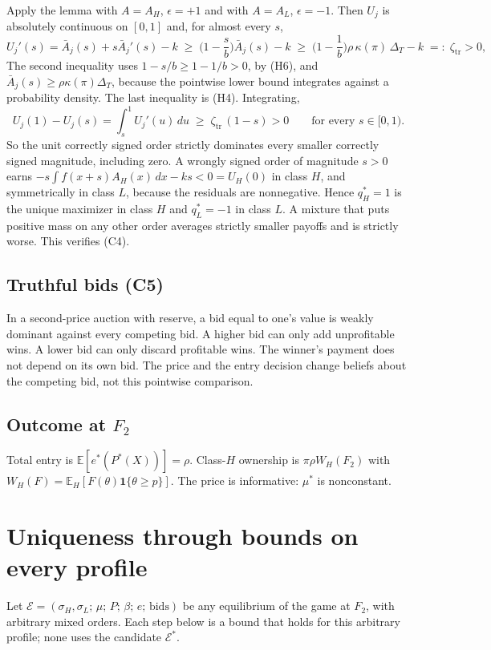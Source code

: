 \documentclass[12pt]{article}
\theoremstyle{remark}
\newcommand{\E}{\mathbb E}
\newcommand{\ind}{\mathbf 1}
\newcommand{\Dt}{\Delta_T}
\begin{document}
Apply the lemma with $A=A_H$, $\epsilon=+1$ and with $A=A_L$, $\epsilon=-1$. Then $U_j$ is
absolutely continuous on $[0,1]$ and, for almost every $s$,
\[
U_j'(s)=\bar A_j(s)+s\bar A_j'(s)-k\;\ge\;\Big(1-\frac sb\Big)\bar A_j(s)-k
\;\ge\;\Big(1-\frac1b\Big)\rho\,\kappa(\pi)\,\Dt-k\;=:\;\zeta_{\mathrm{tr}}>0,
\]
The second inequality uses $1-s/b\ge1-1/b>0$, by (H6), and
$\bar A_j(s)\ge\rho\kappa(\pi)\Dt$, because the pointwise lower bound integrates against a
probability density. The last inequality is (H4). Integrating,
\[
U_j(1)-U_j(s)=\int_s^1U_j'(u)\,du\;\ge\;\zeta_{\mathrm{tr}}\,(1-s)>0\qquad\text{for every }s\in[0,1).
\]
So the unit correctly signed order strictly dominates every smaller correctly signed
magnitude, including zero. A wrongly signed order of magnitude $s>0$ earns
$-s\int f(x+s)A_H(x)\,dx-ks<0=U_H(0)$ in class $H$, and symmetrically in class $L$, because
the residuals are nonnegative. Hence $q_H^*=1$ is the unique maximizer in class $H$ and
$q_L^*=-1$ in class $L$. A mixture that puts positive mass on any other order averages
strictly smaller payoffs and is strictly worse. This verifies (C4).

\subsection{Truthful bids (C5)}
In a second-price auction with reserve, a bid equal to one's value is weakly dominant against
every competing bid. A higher bid can only add unprofitable wins. A lower bid can only discard
profitable wins. The winner's payment does not depend on its own bid. The price and the entry
decision change beliefs about the competing bid, not this pointwise comparison.

\subsection{Outcome at $F_2$}
Total entry is $\E[e^*(P^*(X))]=\rho$. Class-$H$ ownership is $\pi\rho W_H(F_2)$ with
$W_H(F)=\E_H[F(\theta)\ind\{\theta\ge p\}]$. The price is informative: $\mu^*$ is nonconstant.

\section{Uniqueness through bounds on every profile}

Let $\mathcal E=(\sigma_H,\sigma_L;\,\mu;\,P;\,\beta;\,e;\,\text{bids})$ be any equilibrium
of the game at $F_2$, with arbitrary mixed orders. Each step below is a bound that holds for
this arbitrary profile; none uses the candidate $\mathcal E^*$.
\end{document}
